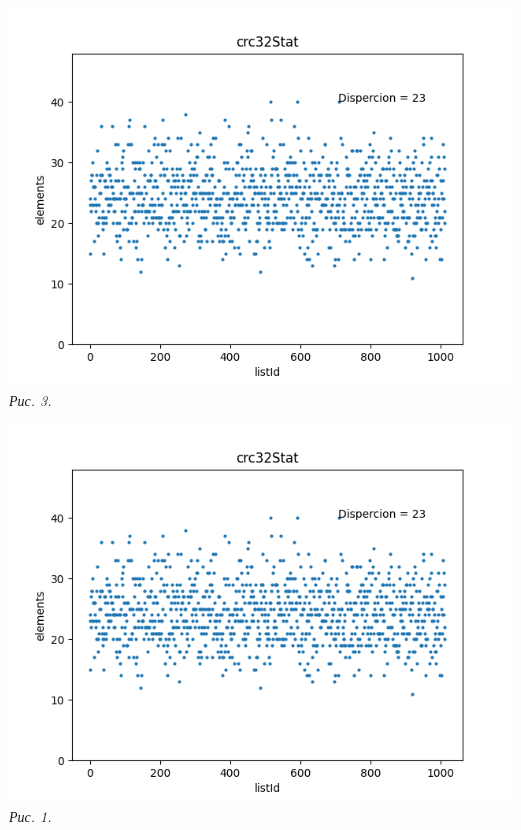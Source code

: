 \noindent\begin{minipage}[h!]{0.45\linewidth}
    \begin{center}
        \includegraphics[width = 1\linewidth]{picks/crc32Stat.png} \\
        \textit{Рис. 3. }
    \end{center} 
\end{minipage}
\begin{minipage}[h!]{0.45\linewidth}
    \begin{center}
        \includegraphics[width = 1\linewidth]{picks/crc32Stat.png} \\
        \textit{Рис. 1. }
    \end{center} 
\end{minipage}


